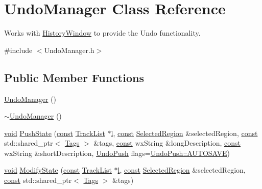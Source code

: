\hypertarget{class_undo_manager}{}\section{Undo\+Manager Class Reference}
\label{class_undo_manager}


Works with \hyperlink{class_history_window}{History\+Window} to provide the Undo functionality.  




{\ttfamily \#include $<$Undo\+Manager.\+h$>$}

\subsection*{Public Member Functions}
\begin{DoxyCompactItemize}
\item 
\hyperlink{class_undo_manager_a91245e899175de68100ec8168806ad38}{Undo\+Manager} ()
\item 
\hyperlink{class_undo_manager_a8d02b39eef79a885fb71be93ddac1115}{$\sim$\+Undo\+Manager} ()
\item 
\hyperlink{sound_8c_ae35f5844602719cf66324f4de2a658b3}{void} \hyperlink{class_undo_manager_a865d84a767400c8bd43e92c927792df9}{Push\+State} (\hyperlink{getopt1_8c_a2c212835823e3c54a8ab6d95c652660e}{const} \hyperlink{class_track_list}{Track\+List} $\ast$\hyperlink{layer3_8c_a741dbb4d8e78c3cb69915db7282fcec0}{l}, \hyperlink{getopt1_8c_a2c212835823e3c54a8ab6d95c652660e}{const} \hyperlink{class_selected_region}{Selected\+Region} \&selected\+Region, \hyperlink{getopt1_8c_a2c212835823e3c54a8ab6d95c652660e}{const} std\+::shared\+\_\+ptr$<$ \hyperlink{class_tags}{Tags} $>$ \&tags, \hyperlink{getopt1_8c_a2c212835823e3c54a8ab6d95c652660e}{const} wx\+String \&long\+Description, \hyperlink{getopt1_8c_a2c212835823e3c54a8ab6d95c652660e}{const} wx\+String \&short\+Description, \hyperlink{_undo_manager_8h_a4df60e74fafdd06fb39cd12db3388114}{Undo\+Push} flags=\hyperlink{_undo_manager_8h_a4df60e74fafdd06fb39cd12db3388114a0650fde039d6d9101c53ade11ecafcd3}{Undo\+Push\+::\+A\+U\+T\+O\+S\+A\+VE})
\item 
\hyperlink{sound_8c_ae35f5844602719cf66324f4de2a658b3}{void} \hyperlink{class_undo_manager_a46453483702f826e6b9832689e936d0c}{Modify\+State} (\hyperlink{getopt1_8c_a2c212835823e3c54a8ab6d95c652660e}{const} \hyperlink{class_track_list}{Track\+List} $\ast$\hyperlink{layer3_8c_a741dbb4d8e78c3cb69915db7282fcec0}{l}, \hyperlink{getopt1_8c_a2c212835823e3c54a8ab6d95c652660e}{const} \hyperlink{class_selected_region}{Selected\+Region} \&selected\+Region, \hyperlink{getopt1_8c_a2c212835823e3c54a8ab6d95c652660e}{const} std\+::shared\+\_\+ptr$<$ \hyperlink{class_tags}{Tags} $>$ \&tags)

\end{DoxyCompactItemize}
